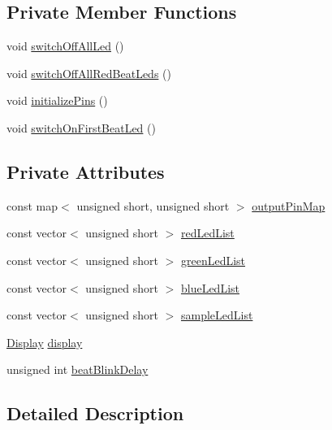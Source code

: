 \subsection*{Private Member Functions}
\begin{DoxyCompactItemize}
\item 
void \hyperlink{class_rasp_output_controller_afdd3bcfa82341a9d2539233abe7cb617}{switch\+Off\+All\+Led} ()
\item 
void \hyperlink{class_rasp_output_controller_a9a5025e13e27544721a80e6725ed23e4}{switch\+Off\+All\+Red\+Beat\+Leds} ()
\item 
void \hyperlink{class_rasp_output_controller_a1172c2966777bbcee89cbe4e6de027d5}{initialize\+Pins} ()
\item 
void \hyperlink{class_rasp_output_controller_a0cacbc3cbca8f1b78318234c6b74e576}{switch\+On\+First\+Beat\+Led} ()
\end{DoxyCompactItemize}
\subsection*{Private Attributes}
\begin{DoxyCompactItemize}
\item 
const map$<$ unsigned short, unsigned short $>$ \hyperlink{class_rasp_output_controller_afd8a9fff94ee9bcf63bcbe6fa810aa32}{output\+Pin\+Map}
\item 
const vector$<$ unsigned short $>$ \hyperlink{class_rasp_output_controller_a8ee2d3ff908d1094cc9d1320133d0bdf}{red\+Led\+List}
\item 
const vector$<$ unsigned short $>$ \hyperlink{class_rasp_output_controller_a8b888abfd8719eb95568abaf53d68d5c}{green\+Led\+List}
\item 
const vector$<$ unsigned short $>$ \hyperlink{class_rasp_output_controller_a9b5e5c4ee94d43d62e41961e6c8bea3b}{blue\+Led\+List}
\item 
const vector$<$ unsigned short $>$ \hyperlink{class_rasp_output_controller_ad0ad19b081450eb1d9cd6548c14a23ea}{sample\+Led\+List}
\item 
\hyperlink{class_display}{Display} \hyperlink{class_rasp_output_controller_a0bb52cfee18c44cd2ed64dea27d5ccc4}{display}
\item 
unsigned int \hyperlink{class_rasp_output_controller_a4deb199f7d611c2be39dc2d59ea45bba}{beat\+Blink\+Delay}
\end{DoxyCompactItemize}


\subsection{Detailed Description}


